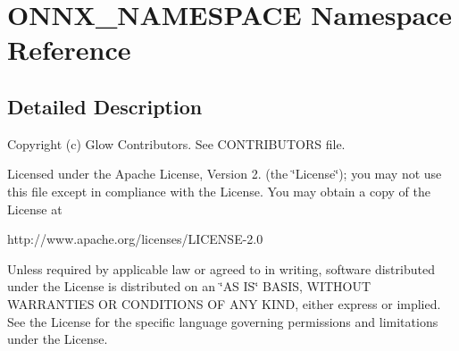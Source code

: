 \hypertarget{namespace_o_n_n_x___n_a_m_e_s_p_a_c_e}{}\section{O\+N\+N\+X\+\_\+\+N\+A\+M\+E\+S\+P\+A\+CE Namespace Reference}
\label{namespace_o_n_n_x___n_a_m_e_s_p_a_c_e}


\subsection{Detailed Description}
Copyright (c) Glow Contributors. See C\+O\+N\+T\+R\+I\+B\+U\+T\+O\+RS file.

Licensed under the Apache License, Version 2. (the \char`\"{}\+License\char`\"{}); you may not use this file except in compliance with the License. You may obtain a copy of the License at \begin{DoxyVerb}http://www.apache.org/licenses/LICENSE-2.0
\end{DoxyVerb}


Unless required by applicable law or agreed to in writing, software distributed under the License is distributed on an \char`\"{}\+A\+S I\+S\char`\"{} B\+A\+S\+IS, W\+I\+T\+H\+O\+UT W\+A\+R\+R\+A\+N\+T\+I\+ES OR C\+O\+N\+D\+I\+T\+I\+O\+NS OF A\+NY K\+I\+ND, either express or implied. See the License for the specific language governing permissions and limitations under the License. 